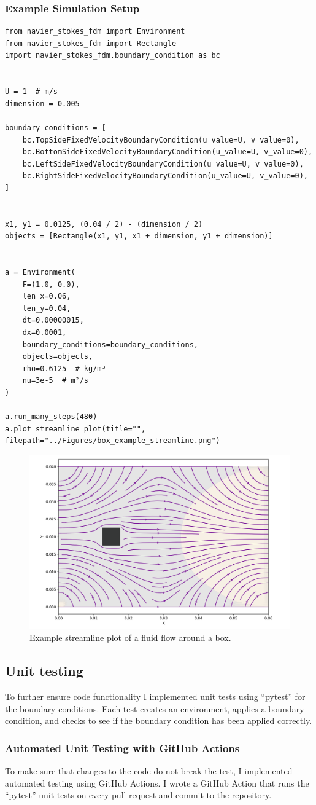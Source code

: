 \subsubsection{Example Simulation Setup}
\begin{verbatim}
from navier_stokes_fdm import Environment
from navier_stokes_fdm import Rectangle
import navier_stokes_fdm.boundary_condition as bc


U = 1  # m/s
dimension = 0.005

boundary_conditions = [
    bc.TopSideFixedVelocityBoundaryCondition(u_value=U, v_value=0),
    bc.BottomSideFixedVelocityBoundaryCondition(u_value=U, v_value=0),
    bc.LeftSideFixedVelocityBoundaryCondition(u_value=U, v_value=0),
    bc.RightSideFixedVelocityBoundaryCondition(u_value=U, v_value=0),
]


x1, y1 = 0.0125, (0.04 / 2) - (dimension / 2)
objects = [Rectangle(x1, y1, x1 + dimension, y1 + dimension)]


a = Environment(
    F=(1.0, 0.0),
    len_x=0.06,
    len_y=0.04,
    dt=0.00000015,
    dx=0.0001,
    boundary_conditions=boundary_conditions,
    objects=objects,
    rho=0.6125  # kg/m³
    nu=3e-5  # m²/s
)

a.run_many_steps(480)
a.plot_streamline_plot(title="", filepath="../Figures/box_example_streamline.png")
\end{verbatim}

\begin{figure}[h]
    \centering
    \includegraphics[width=0.5\linewidth]{Figures/box_example_streamline.png}
    \caption{Example streamline plot of a fluid flow around a box.}
    \label{fig:box_example_streamline}
\end{figure}



\subsection{Unit testing}
To further ensure code functionality I implemented unit tests using ``pytest'' for the boundary conditions.
Each test creates an environment, applies a boundary condition, and checks to see if the boundary condition has been applied correctly.

\subsubsection{Automated Unit Testing with GitHub Actions}
To make sure that changes to the code do not break the test, I implemented automated testing using GitHub Actions.
I wrote a GitHub Action that runs the ``pytest'' unit tests on every pull request and commit to the repository.
